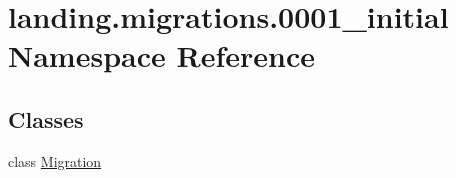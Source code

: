 \hypertarget{namespacelanding_1_1migrations_1_10001__initial}{}\section{landing.\+migrations.0001\+\_\+initial Namespace Reference}
\label{namespacelanding_1_1migrations_1_10001__initial}
\subsection*{Classes}
\begin{DoxyCompactItemize}
\item 
class \mbox{\hyperlink{classlanding_1_1migrations_1_10001__initial_1_1Migration}{Migration}}
\end{DoxyCompactItemize}
